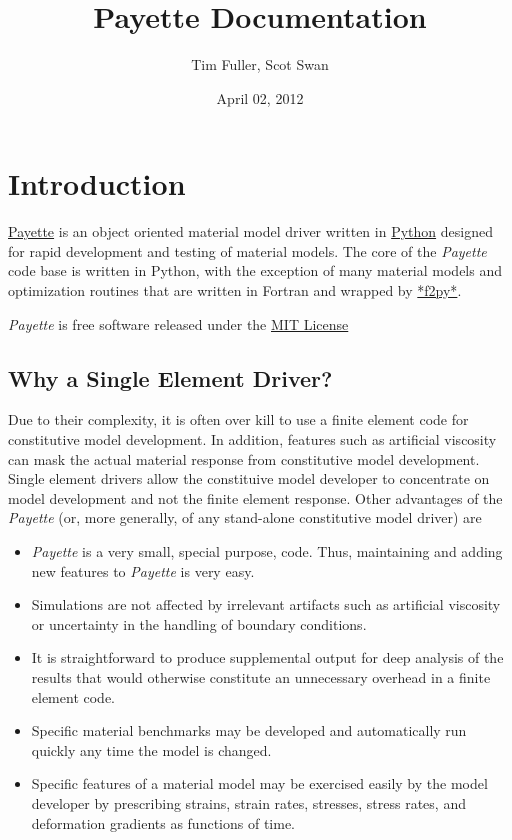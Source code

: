 \documentclass[letterpaper,10pt,english]{sphinxmanual}
\title{Payette Documentation}
\date{April 02, 2012}
\author{Tim Fuller, Scot Swan}
\begin{document}
\maketitle
\tableofcontents
{}\label{index::doc}



\chapter{Introduction}
\label{Files/introduction:introduction}\label{Files/introduction::doc}\label{Files/introduction:payette-material-model-driver-official-documentation}
\href{http://www.eng.utah.edu/~timothyf}{Payette} is an object oriented
material model driver written in \href{http://www.python.org}{Python} designed
for rapid development and testing of material models. The core of the
\emph{Payette} code base is written in Python, with the exception of many material
models and optimization routines that are written in Fortran and wrapped by
\href{http://www.scipy.org/F2py}{*f2py*}.

\emph{Payette} is free software released under the
\href{http://www.wikipedia.org/wiki/MIT\_License}{MIT License}


\section{Why a Single Element Driver?}
\label{Files/introduction:why-a-single-element-driver}
Due to their complexity, it is often over kill to use a finite element code for
constitutive model development. In addition, features such as artificial
viscosity can mask the actual material response from constitutive model
development. Single element drivers allow the constituive model developer to
concentrate on model development and not the finite element response. Other
advantages of the \emph{Payette} (or, more generally, of any stand-alone constitutive
model driver) are
\begin{itemize}
\item {} 
\emph{Payette} is a very small, special purpose, code. Thus, maintaining and
adding new features to \emph{Payette} is very easy.

\item {} 
Simulations are not affected by irrelevant artifacts such as artificial
viscosity or uncertainty in the handling of boundary conditions.

\item {} 
It is straightforward to produce supplemental output for deep analysis of the
results that would otherwise constitute an unnecessary overhead in a finite
element code.

\item {} 
Specific material benchmarks may be developed and automatically run quickly
any time the model is changed.

\item {} 
Specific features of a material model may be exercised easily by the model
developer by prescribing strains, strain rates, stresses, stress rates, and
deformation gradients as functions of time.

\end{itemize}
\end{document}
